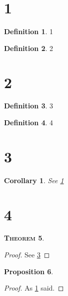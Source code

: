\documentclass{article}
\newtheorem{thm}{\textsc{Theorem}}[subsection]
\newtheorem{prop}[thm]{Proposition}
\newtheorem{cor}{Corollary}[thm]
\theoremstyle{definition}
\newtheorem{defn}[thm]{Definition}
\begin{document}
\section{1}

\begin{defn}
	\label{def:1}
	1
\end{defn}

\begin{defn}
	\label{def:2}
	2
\end{defn}

\section{2}

\begin{defn}
	\label{def:3}
	3
\end{defn}

\begin{defn}
	\label{def:4}
	4
\end{defn}

\section{3}

\begin{cor}
	\label{cor:back1}
	See \ref{def:1}
\end{cor}

\section{4}

\begin{thm}
	\label{thm:back3}
\end{thm}
\begin{proof}
	See \ref{def:3}
\end{proof}

\begin{prop}
	\label{prop:backcor}
\end{prop}
\begin{proof}
	As \ref{cor:back1} said.
\end{proof}
\end{document}
